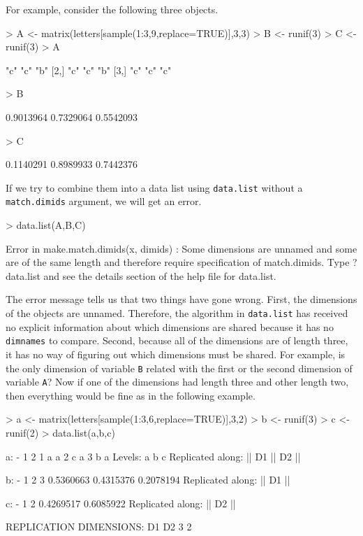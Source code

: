\documentclass{article}
\newcommand{\code}[1]{\texttt{#1}}
\numberwithin{exercise}{section}
\begin{document}
For example, consider the following three objects.
\begin{Schunk}
\begin{Sinput}
> A <- matrix(letters[sample(1:3,9,replace=TRUE)],3,3)
> B <- runif(3)
> C <- runif(3)
> A
\end{Sinput}
\begin{Soutput}
     [,1] [,2] [,3]
[1,] "c"  "c"  "b" 
[2,] "c"  "c"  "b" 
[3,] "c"  "c"  "c" 
\end{Soutput}
\begin{Sinput}
> B
\end{Sinput}
\begin{Soutput}
[1] 0.9013964 0.7329064 0.5542093
\end{Soutput}
\begin{Sinput}
> C
\end{Sinput}
\begin{Soutput}
[1] 0.1140291 0.8989933 0.7442376
\end{Soutput}
\end{Schunk}
If we try to combine them into a data list using \code{data.list} without a \code{match.dimids} argument, we will get an error.
\begin{Schunk}
\begin{Sinput}
> data.list(A,B,C)
\end{Sinput}
\end{Schunk}
\begin{Schunk}
\begin{Soutput}
Error in make.match.dimids(x, dimids) : 
  Some dimensions are unnamed and some are 
of the same length and therefore require
specification of match.dimids. Type
?data.list and see the details section
of the help file for data.list.
\end{Soutput}
\end{Schunk}
The error message tells us that two things have gone wrong.  First, the dimensions of the objects are unnamed.  Therefore, the algorithm in \code{data.list} has received no explicit information about which dimensions are shared because it has no \code{dimnames} to compare.  Second, because all of the dimensions are of length three, it has no way of figuring out which dimensions must be shared.  For example, is the only dimension of variable \code{B} related with the first or the second dimension of variable \code{A}?  Now if one of the dimensions had length three and other length two, then everything would be fine as in the following example.
\begin{Schunk}
\begin{Sinput}
> a <- matrix(letters[sample(1:3,6,replace=TRUE)],3,2)
> b <- runif(3)
> c <- runif(2)
> data.list(a,b,c)
\end{Sinput}
\begin{Soutput}
a:
-
  1 2
1 a a
2 c a
3 b a
Levels: a b c
Replicated along:  || D1 || D2 || 


b:
-
        1         2         3 
0.5360663 0.4315376 0.2078194 
Replicated along:  || D1 || 


c:
-
        1         2 
0.4269517 0.6085922 
Replicated along:  || D2 || 


REPLICATION DIMENSIONS: 
D1 D2 
 3  2 
\end{Soutput}
\end{Schunk}
\end{document}
